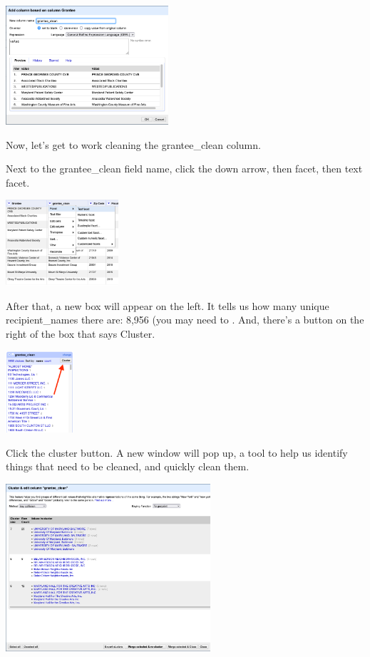 \documentclass[
  letterpaper,
  DIV=11,
  numbers=noendperiod]{scrreprt}
\begin{document}
\includegraphics[width=2.37in,height=\textheight]{./images/open2b.png}

Now, let's get to work cleaning the grantee\_clean column.

Next to the grantee\_clean field name, click the down arrow, then facet,
then text facet.

\includegraphics[width=1.65in,height=\textheight]{./images/open3.png}

After that, a new box will appear on the left. It tells us how many
unique recipient\_names there are: 8,956 (you may need to . And, there's
a button on the right of the box that says Cluster.

\includegraphics[width=0.99in,height=\textheight]{./images/open4.png}

Click the cluster button. A new window will pop up, a tool to help us
identify things that need to be cleaned, and quickly clean them.

\includegraphics[width=2.99in,height=\textheight]{./images/open5.png}
\end{document}
